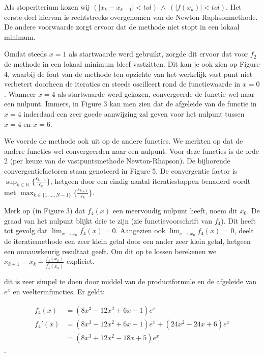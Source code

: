 \documentclass[a4paper,
headings=standardclasses
]{scrartcl}
\newcommand{\NN}{\mathbb{N}}
\theoremstyle{remark}
\theoremstyle{definition}
\begin{document}
Als stopcriterium kozen wij $(|x_k - x_{k-1}| < tol)\: \land \:(|f(x_k)| < tol)$.
Het eerste deel hiervan is rechtstreeks overgenomen van de Newton-Raphsonmethode.
De andere voorwaarde zorgt ervoor dat de methode niet stopt in een lokaal minimum.

Omdat steeds $x=1$ als startwaarde werd gebruikt, zorgde dit ervoor dat voor $f_2$ de methode in een lokaal minimum bleef vastzitten.
Dit kan je ook zien op Figure 4, waarbij de fout van de methode ten opzichte van het werkelijk vast punt niet verbetert
doorheen de iteraties en steeds oscilleert rond de functiewaarde in $x=0$. Wanneer $x=4$ als startwaarde werd gekozen, convergeerde de functie wel naar een nulpunt.
Immers, in Figure 3 kan men zien dat de afgeleide van de functie in $x=4$ inderdaad een zeer goede aanwijzing zal geven voor
het nulpunt tussen $x=4$ en $x=6$.
 
We voerde de methode ook uit op de andere functies. We merkten op dat de andere functies
wel convergeerden naar een nulpunt. Voor deze functies is de orde 2 (per keuze van de vastpuntsmethode Newton-Rhapson).
De bijhorende convergentiefactoren staan genoteerd in Figure 5.
De convergentie factor is $\sup_{k \in \NN} \{ \frac{\varepsilon_{k+1}}{\varepsilon_{k}}  \} $, hetgeen door een eindig aantal
iteratiestappen benaderd wordt met $\max_{k \in \{ 1, ..., N-1\} } \{ \frac{\varepsilon_{k+1}}{\varepsilon_{k}}  \} $.
 
Merk op (in Figure 3) dat $f_4(x)$ een meervoudig nulpunt heeft, noem dit $x_0$.
De graad van het nulpunt blijkt drie te zijn (zie functievoorschrift van $f_4$).
Dit heeft tot gevolg dat $\lim_{x \to x_0}  f_4^{'} (x) = 0$. Aangezien ook $\lim_{x \to x_0} f_4(x) $ = 0, 
deelt de iteratiemethode een zeer klein getal door een ander zeer klein getal, hetgeen een onnauwkeurig resultaat
geeft. Om dit op te lossen berekenen we $x_{k+1} = x_k - \frac{f_4(x_k)}{f_4^{'}(x_k)}$ expliciet.

dit is zeer simpel te doen door middel van de productformule en de afgeleide van $e^x$ en veeltermfuncties.
Er geldt:

\begin{align*}
    f_4(x) &= (8x^3 - 12x^2 + 6x - 1)e^x \\
    f_4'(x) &= (8x^3 - 12x^2 + 6x - 1)e^x + (24x^2 - 24x + 6)e^x \\
              &= (8x^3 + 12x^2 - 18x + 5)e^x
\end{align*}.
\end{document}
